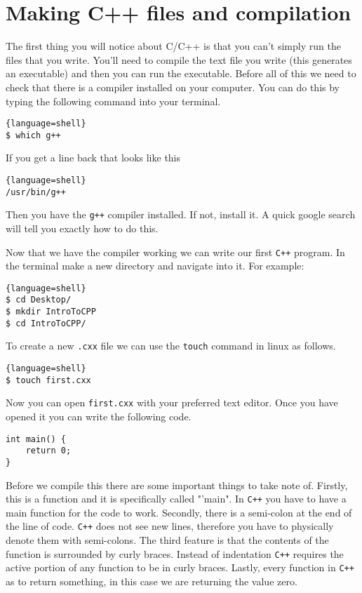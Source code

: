 \section{Making C++ files and compilation}
The first thing you will notice about C/C++ is that you can't simply run the files that you write.
You'll need to compile the text file you write (this generates an executable) and then you can run the executable.
Before all of this we need to check that there is a compiler installed on your computer. 
You can do this by typing the following command into your terminal.

\lstset{style=mystyle}
\begin{lstlisting}{language=shell}
$ which g++
\end{lstlisting}
If you get a line back that looks like this
\begin{lstlisting}{language=shell}
/usr/bin/g++
\end{lstlisting}
Then you have the \texttt{g++} compiler installed. If not, install it.
A quick google search will tell you exactly how to do this.

Now that we have the compiler working we can write our first \texttt{C++} program.
In the terminal make a new directory and navigate into it.
For example:
\begin{lstlisting}{language=shell}
$ cd Desktop/
$ mkdir IntroToCPP
$ cd IntroToCPP/
\end{lstlisting}
To create a new \texttt{.cxx} file we can use the \texttt{touch} command in linux as follows.
\begin{lstlisting}{language=shell}
$ touch first.cxx
\end{lstlisting}
Now you can open \texttt{first.cxx} with your preferred text editor.
Once you have opened it you can write the following code.
\lstset{style=mystyle}
\begin{lstlisting}
int main() {
	return 0;
}
\end{lstlisting}
Before we compile this there are some important things to take note of. 
Firstly, this is a function and it is specifically called "'main".
In \texttt{C++} you have to have a main function for the code to work.
Secondly, there is a semi-colon at the end of the line of code.
\texttt{C++} does not see new lines, therefore you have to physically denote them with semi-colons.
The third feature is that the contents of the function is surrounded by curly braces. 
Instead of indentation \texttt{C++} requires the active portion of any function to be in curly braces.
Lastly, every function in \texttt{C++} as to return something, in this case we are returning the value zero.

